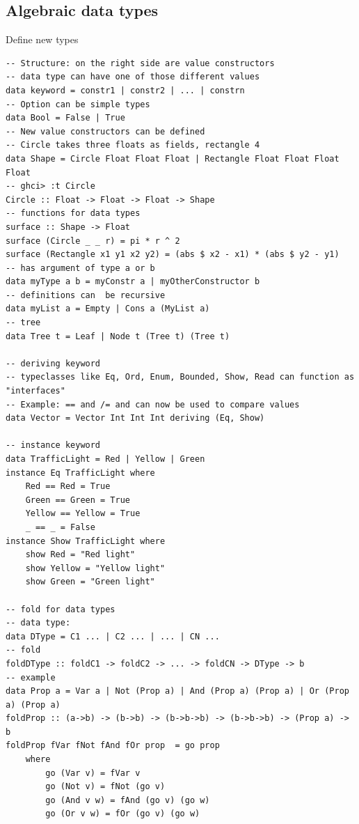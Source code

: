 \documentclass{article}
\begin{document}
\subsection{Algebraic data types}
Define new types
\begin{verbatim}
-- Structure: on the right side are value constructors
-- data type can have one of those different values
data keyword = constr1 | constr2 | ... | constrn
-- Option can be simple types
data Bool = False | True
-- New value constructors can be defined
-- Circle takes three floats as fields, rectangle 4
data Shape = Circle Float Float Float | Rectangle Float Float Float Float   
-- ghci> :t Circle
Circle :: Float -> Float -> Float -> Shape  
-- functions for data types
surface :: Shape -> Float  
surface (Circle _ _ r) = pi * r ^ 2  
surface (Rectangle x1 y1 x2 y2) = (abs $ x2 - x1) * (abs $ y2 - y1) 
-- has argument of type a or b
data myType a b = myConstr a | myOtherConstructor b
-- definitions can  be recursive
data myList a = Empty | Cons a (MyList a)
-- tree
data Tree t = Leaf | Node t (Tree t) (Tree t)

-- deriving keyword
-- typeclasses like Eq, Ord, Enum, Bounded, Show, Read can function as "interfaces"
-- Example: == and /= and can now be used to compare values
data Vector = Vector Int Int Int deriving (Eq, Show)

-- instance keyword
data TrafficLight = Red | Yellow | Green  
instance Eq TrafficLight where  
    Red == Red = True  
    Green == Green = True  
    Yellow == Yellow = True  
    _ == _ = False  
instance Show TrafficLight where  
    show Red = "Red light"  
    show Yellow = "Yellow light"  
    show Green = "Green light" 

-- fold for data types
-- data type:
data DType = C1 ... | C2 ... | ... | CN ...
-- fold
foldDType :: foldC1 -> foldC2 -> ... -> foldCN -> DType -> b
-- example
data Prop a = Var a | Not (Prop a) | And (Prop a) (Prop a) | Or (Prop a) (Prop a)
foldProp :: (a->b) -> (b->b) -> (b->b->b) -> (b->b->b) -> (Prop a) -> b
foldProp fVar fNot fAnd fOr prop  = go prop
    where 
        go (Var v) = fVar v
        go (Not v) = fNot (go v)
        go (And v w) = fAnd (go v) (go w) 
        go (Or v w) = fOr (go v) (go w)
\end{verbatim}  
\end{document}
